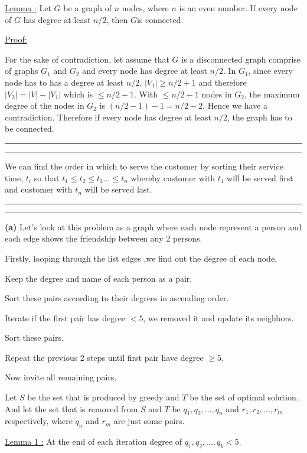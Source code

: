 \documentclass[a4paper, 12pt]{article}
\newcommand{\question}[1] {\vspace{.25in} \hrule\vspace{0.5em}
	\noindent{\bf #1} \vspace{0.5em}
	\hrule \vspace{.10in}}
\renewcommand{\part}[1] {\vspace{.10in} {\bf (#1)}}
\begin{document}
\underline{Lemma :} Let $G$ be a graph of $n$ nodes, where $n$ is an even number. If every node of $G$ has degree at least $n/2$, then $G$is connected.

\underline{Proof: }

For the sake of contradiction, let assume that $G$ is a disconnected graph comprise of graphs $G_1$ and $G_2$ and every node has degree at least $n/2$. In $G_1$, since every node has to has a degree at least $n/2$, $|V_1| \geqslant n/2+1$ and therefore $|V_2| = |V|-|V_1|$ which is $\leqslant n/2-1$. With $\leqslant n/2-1$ nodes in $G_2$, the maximum degree of the nodes in $G_2$ is $(n/2-1)-1 = n/2-2$. Hence we have a contradiction. Therefore if every node has degree at least $n/2$, the graph has to be connected.

\question{Problem 4}
We can find the order in which to serve the customer by sorting their service time, $t_i$ so that $t_1\leqslant t_2 \leqslant t_3 ... \leqslant t_n $ whereby customer with $t_1$ will be served first and customer with $t_n$ will be served last.

\question{Problem 5}
\part{a}
Let's look at this problem as a graph where each node represent a person and each edge shows the friendship between any 2 persons.
\begin{description}[font=$\bullet$]
	\item[] Firstly, looping through the list edges ,we find out the degree of each node.
	\item[] Keep the degree and name of each person as a pair.
	\item[] Sort these pairs according to their degrees in ascending order.
	\item[] Iterate if the first pair has degree $< 5$, we removed it and update its neighbors.
	\item[] Sort these pairs.
	\item [] Repeat the previous 2 steps until first pair have degree $\geqslant 5$.
	\item [] Now invite all remaining pairs.  
\end{description}
Let $S$ be the set that is produced by greedy and $T$ be the set of optimal solution. And let the set that is removed from $S$ and $T$ be $q_1,q_2,...,q_n$ and $r_1,r_2,...,r_m$ respectively, where $q_n$ and $r_m$ are just some pairs.

\underline{Lemma 1 :} At the end of each iteration degree of $q_1,q_2,...,q_k < 5$.
\end{document}

